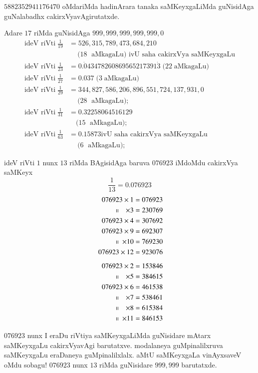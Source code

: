 $5882352941176470$ oMdariMda hadinArara tanaka saMKeyxgaLiMda guNisidAga guNalabadhx cakirxVyavAgirutatxde.

Adare $17$ riMda guNisidAga $999,999,999,999,999,0$
\begin{align*}
\text{ideV riVti} \;\frac{1}{19} &=  526, 315, 789, 473, 684, 210\\
&\quad ~(18\; \text{ aMkagaLu)  ivU saha cakirxVya saMKeyxgaLu}\\[0.1cm]
\text{ideV riVti}\; \frac{1}{23} &=  0.{\dot 0}43478260869565217391{\dot 3}\; (22 \;\text{aMkagaLu)}\\
\text{ideV riVti} \;\frac{1}{27} &=  0.037 \;(3 \;\text{aMkagaLu)}\\
\text{ideV riVti} \;\frac{1}{29} &=  344,827,586,206,896,551,724,137,931,0\\
&\quad ~(28\; \text{ aMkagaLu)};\\
\text{ideV riVti} \;\frac{1}{31} &=  0.32258064516129\\
&\quad(15\; \text{ aMkagaLu)};\\
\text{ideV riVti}\;\frac{1}{63} &=   0.15873 \text{ivU saha cakirxVya saMKeyxgaLu}\\
 &\quad ~(6\; \text{ aMkagaLu)};
\end{align*}

ideV riVti $1$ nunx $13$ riMda BAgisidAga baruva $076923$ iMdoMdu cakirxVya saMKeyx
$$
\frac{1}{13} = 0.076923
$$
\begin{align*}
076923 \times 1 &= 076923 \\
~~~~~~~~~\shortparallel ~~~\times 3 &= 230769 \\ 
076923\times 4 &= 307692 \\
076923\times 9 &= 692307 \\ 
~~~~~~~~~~~\shortparallel ~\times 10 &= 769230 \\
076923\times 12 &= 923076\\[5pt] 
076923 \times 2 &= 153846 \\
~~~~~~~~~\shortparallel ~~~\times 5 &= 384615 \\
076923   \times 6 &= 461538 \\
~~~~~~~~~\shortparallel ~~~\times 7 &= 538461 \\
~~~~~~~~~\shortparallel ~~~\times 8 &= 615384 \\
~~~~~~~~~~~\shortparallel ~\times 11 &= 846153 
\end{align*}

$076923$ nunx  I eraDu riVtiya saMKeyxgaLiMda guNisidare mAtarx saMKeyxgaLu cakirxVyavAgi barutatxve. modalaneya guMpinalilxruva saMKeyxgaLu eraDaneya guMpinalilxlalx. aMtU saMKeyxgaLa vinAyxsaveV oMdu sobagu! $076923$ nunx $13$ riMda guNisidare $999,999$ barutatxde.
